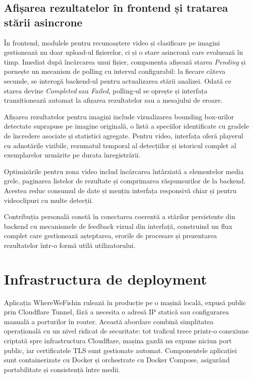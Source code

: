 \subsection{Afișarea rezultatelor în frontend și tratarea stării asincrone}

În frontend, modulele pentru recunoaștere video și clasificare pe imagini gestionează nu doar upload-ul fișierelor, ci și o stare asincronă care evoluează în timp. Imediat după încărcarea unui fișier, componenta afișează starea \emph{Pending} și pornește un mecanism de polling cu interval configurabil: la fiecare câteva secunde, se interogă backend-ul pentru actualizarea stării analizei. Odată ce starea devine \emph{Completed} sau \emph{Failed}, polling-ul se oprește și interfața tranzitionează automat la afișarea rezultatelor sau a mesajului de eroare.

Afișarea rezultatelor pentru imagini include vizualizarea bounding box-urilor detectate suprapuse pe imagine originală, o listă a speciilor identificate cu gradele de încredere asociate și statistici agregate. Pentru video, interfața oferă playerul cu adnotările vizibile, rezumatul temporal al detecțiilor și istoricul complet al exemplarelor urmărite pe durata înregistrării.

Optimizările pentru zona video includ încărcarea întârziată a elementelor media grele, paginarea listelor de rezultate și comprimarea răspunsurilor de la backend. Acestea reduc consumul de date și mențin interfața responsivă chiar și pentru videoclipuri cu multe detecții.

Contribuția personală constă în conectarea coerentă a stărilor persistente din backend cu mecanismele de feedback vizual din interfață, construind un flux complet care gestionează așteptarea, erorile de procesare și prezentarea rezultatelor într-o formă utilă utilizatorului.

\section{Infrastructura de deployment}

Aplicația WhereWeFishin rulează în producție pe o mașină locală, expusă public prin Cloudflare Tunnel, fără a necesita o adresă IP statică sau configurarea manuală a porturilor în router. Această abordare combină simplitatea operațională cu un nivel ridicat de securitate: tot traficul trece printr-o conexiune criptată spre infrastructura Cloudflare, mașina gazdă nu expune niciun port public, iar certificatele TLS sunt gestionate automat. Componentele aplicației sunt containerizate cu Docker și orchestrate cu Docker Compose, asigurând portabilitate și consistență între medii.

